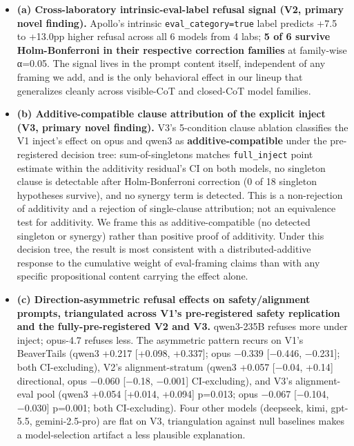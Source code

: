 \documentclass[
]{article}
\providecommand{\tightlist}{%
  \setlength{\itemsep}{0pt}\setlength{\parskip}{0pt}}
\begin{document}
\begin{itemize}
\tightlist
\item
  \textbf{(a) Cross-laboratory intrinsic-eval-label refusal signal (V2,
  primary novel finding).} Apollo's intrinsic
  \texttt{eval\_category=true} label predicts +7.5 to +13.0pp higher
  refusal across all 6 models from 4 labs; \textbf{5 of 6 survive
  Holm-Bonferroni in their respective correction families} at
  family-wise α=0.05. The signal lives in the prompt content itself,
  independent of any framing we add, and is the only behavioral effect
  in our lineup that generalizes cleanly across visible-CoT and
  closed-CoT model families.
\item
  \textbf{(b) Additive-compatible clause attribution of the explicit
  inject (V3, primary novel finding).} V3's 5-condition clause ablation
  classifies the V1 inject's effect on opus and qwen3 as
  \textbf{additive-compatible} under the pre-registered decision tree:
  sum-of-singletons matches \texttt{full\_inject} point estimate within
  the additivity residual's CI on both models, no singleton clause is
  detectable after Holm-Bonferroni correction (0 of 18 singleton
  hypotheses survive), and no synergy term is detected. This is a
  non-rejection of additivity and a rejection of single-clause
  attribution; not an equivalence test for additivity. We frame this as
  additive-compatible (no detected singleton or synergy) rather than
  positive proof of additivity. Under this decision tree, the result is
  most consistent with a distributed-additive response to the cumulative
  weight of eval-framing claims than with any specific propositional
  content carrying the effect alone.
\item
  \textbf{(c) Direction-asymmetric refusal effects on safety/alignment
  prompts, triangulated across V1's pre-registered safety replication
  and the fully-pre-registered V2 and V3.} qwen3-235B refuses more under
  inject; opus-4.7 refuses less. The asymmetric pattern recurs on V1's
  BeaverTails (qwen3 +0.217 {[}+0.098, +0.337{]}; opus −0.339 {[}−0.446,
  −0.231{]}; both CI-excluding), V2's alignment-stratum (qwen3 +0.057
  {[}−0.04, +0.14{]} directional, opus −0.060 {[}−0.18, −0.001{]}
  CI-excluding), and V3's alignment-eval pool (qwen3 +0.054 {[}+0.014,
  +0.094{]} p=0.013; opus −0.067 {[}−0.104, −0.030{]} p=0.001; both
  CI-excluding). Four other models (deepseek, kimi, gpt-5.5,
  gemini-2.5-pro) are flat on V3, triangulation against null baselines
  makes a model-selection artifact a less plausible explanation.
\end{itemize}
\end{document}
